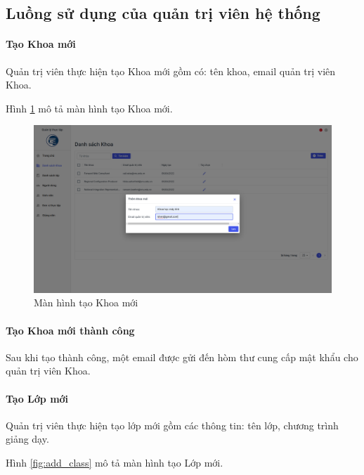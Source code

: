 \documentclass[./../main.tex]{subfiles}
\begin{document}
\subsection{Luồng sử dụng của quản trị viên hệ thống}

\paragraph*{Tạo Khoa mới}

Quản trị viên thực hiện tạo Khoa mới gồm có: tên khoa, email quản trị viên Khoa.

Hình \ref{fig:add_org} mô tả màn hình tạo Khoa mới.

\begin{figure}[]
	\includegraphics[width=\linewidth]{./images/image23.png}
	\caption{Màn hình tạo Khoa mới}
	\label{fig:add_org}
\end{figure}

\paragraph*{Tạo Khoa mới thành công}

Sau khi tạo thành công, một email được gửi đến hòm thư cung cấp mật khẩu cho quản trị viên Khoa.


\paragraph*{Tạo Lớp mới}

Quản trị viên thực hiện tạo lớp mới gồm các thông tin: tên lớp, chương trình giảng dạy.

Hình \ref{fig:add_class} mô tả màn hình tạo Lớp mới.
\end{document}
